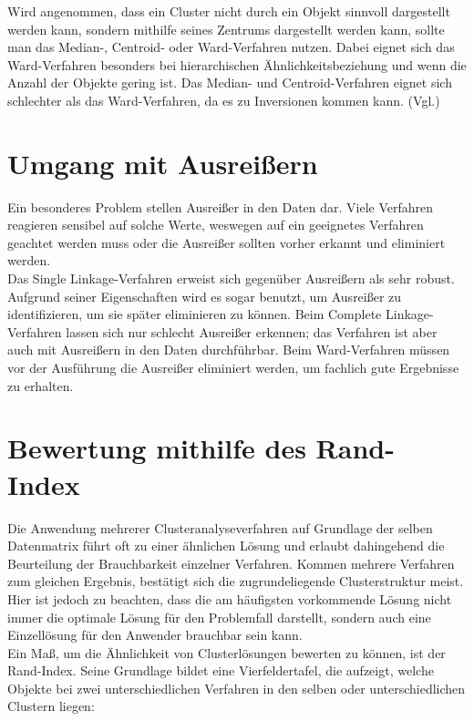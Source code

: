 Wird angenommen, dass ein Cluster nicht durch ein Objekt sinnvoll dargestellt werden kann, sondern mithilfe seines Zentrums dargestellt werden kann, sollte man das Median-, Centroid- oder Ward-Verfahren nutzen. Dabei eignet sich das Ward-Verfahren besonders bei hierarchischen Ähnlichkeitsbeziehung und wenn die Anzahl der Objekte gering ist. Das Median- und Centroid-Verfahren eignet sich schlechter als das Ward-Verfahren, da es zu Inversionen kommen kann. (Vgl.\citet[S.295]{Bacher.2010})

\section{Umgang mit Ausreißern}

Ein besonderes Problem stellen Ausreißer in den Daten dar. Viele Verfahren reagieren sensibel auf solche Werte, weswegen auf ein geeignetes Verfahren geachtet werden muss oder die Ausreißer sollten vorher erkannt und eliminiert werden. \\
Das Single Linkage-Verfahren erweist sich gegenüber Ausreißern als sehr robust. Aufgrund seiner Eigenschaften wird es sogar benutzt, um Ausreißer zu identifizieren, um sie später eliminieren zu können. Beim Complete Linkage-Verfahren lassen sich nur schlecht Ausreißer erkennen; das Verfahren ist aber auch mit Ausreißern in den Daten durchführbar. Beim Ward-Verfahren müssen vor der Ausführung die Ausreißer eliminiert werden, um fachlich gute Ergebnisse zu erhalten.

\section{Bewertung mithilfe des Rand-Index}

Die Anwendung mehrerer Clusteranalyseverfahren auf Grundlage der selben Datenmatrix führt oft zu einer ähnlichen Lösung und erlaubt dahingehend die Beurteilung der Brauchbarkeit einzelner Verfahren. Kommen mehrere Verfahren zum gleichen Ergebnis, bestätigt sich die zugrundeliegende Clusterstruktur meist. Hier ist jedoch zu beachten, dass die am häufigsten vorkommende Lösung nicht immer die optimale Lösung für den Problemfall darstellt, sondern auch eine Einzellösung für den Anwender brauchbar sein kann. \\
Ein Maß, um die Ähnlichkeit von Clusterlösungen bewerten zu können, ist der Rand-Index. Seine Grundlage bildet eine Vierfeldertafel, die aufzeigt, welche Objekte bei zwei unterschiedlichen Verfahren in den selben oder unterschiedlichen Clustern liegen:

